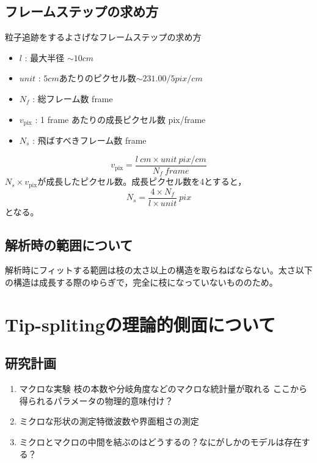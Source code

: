 \documentclass{ltjsarticle}
\begin{document}
\subsection{フレームステップの求め方}
粒子追跡をするよさげなフレームステップの求め方
\begin{itemize}
  \item $l$ : 最大半径 $\sim 10 \si{cm}$
  \item $unit$ : $5\si{cm}$あたりのピクセル数$\sim231.00/5 \si{pix/cm}$
  \item $N_f$ : 総フレーム数 frame
  \item $v_\mathrm{pix}$ : 1 frame あたりの成長ピクセル数 pix/frame
  \item $N_s$ : 飛ばすべきフレーム数 frame
\end{itemize}
\begin{equation}
  v_\mathrm{pix}=\frac{l ~\si{cm}\times unit ~\si{pix/cm}}{N_f ~\si{frame}}
\end{equation}
$N_s\times v_\mathrm{pix}$が成長したピクセル数。成長ピクセル数を4とすると，
\begin{equation}
  N_s= \frac{4\times N_f}{l \times unit} ~\si{pix}
\end{equation}
となる。
\subsection{解析時の範囲について}
解析時にフィットする範囲は枝の太さ以上の構造を取らねばならない。太さ以下の構造は成長する際のゆらぎで，完全に枝になっていないもののため。
\section{Tip-splitingの理論的側面について}
\subsection{研究計画}
\begin{enumerate}
  \item マクロな実験 \rightarrow 枝の本数や分岐角度などのマクロな統計量が取れる \rightarrow ここから得られるパラメータの物理的意味付け？
  \item ミクロな形状の測定\cite{schilardi2000stable}\rightarrow 特徴波数や界面粗さの測定
  \item ミクロとマクロの中間を結ぶのはどうするの？\rightarrow なにがしかのモデルは存在する？
\end{enumerate}


\end{document}
